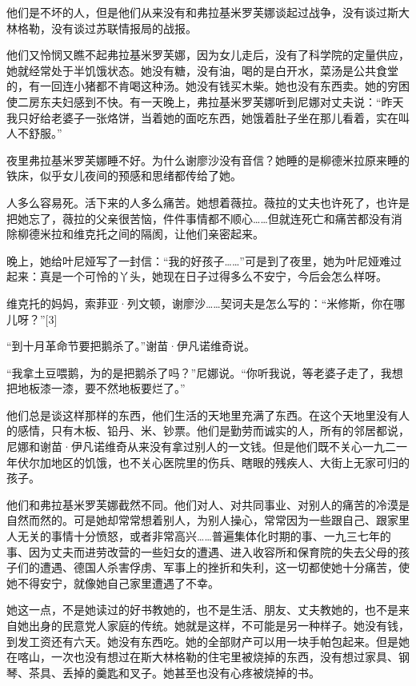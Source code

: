他们是不坏的人，但是他们从来没有和弗拉基米罗芙娜谈起过战争，没有谈过斯大林格勒，没有谈过苏联情报局的战报。

他们又怜悯又瞧不起弗拉基米罗芙娜，因为女儿走后，没有了科学院的定量供应，她就经常处于半饥饿状态。她没有糖，没有油，喝的是白开水，菜汤是公共食堂的，有一回连小猪都不肯喝这种汤。她没有钱买木柴。她也没有东西卖。她的穷困使二房东夫妇感到不快。有一天晚上，弗拉基米罗芙娜听到尼娜对丈夫说：“昨天我只好给老婆子一张烙饼，当着她的面吃东西，她饿着肚子坐在那儿看着，实在叫人不舒服。”

夜里弗拉基米罗芙娜睡不好。为什么谢廖沙没有音信？她睡的是柳德米拉原来睡的铁床，似乎女儿夜间的预感和思绪都传给了她。

人多么容易死。活下来的人多么痛苦。她想着薇拉。薇拉的丈夫也许死了，也许是把她忘了，薇拉的父亲很苦恼，件件事情都不顺心……但就连死亡和痛苦都没有消除柳德米拉和维克托之间的隔阂，让他们亲密起来。

晚上，她给叶尼娅写了一封信：“我的好孩子……”可是到了夜里，她为叶尼娅难过起来：真是一个可怜的丫头，她现在日子过得多么不安宁，今后会怎么样呀。

维克托的妈妈，索菲亚·列文顿，谢廖沙……契诃夫是怎么写的：“米修斯，你在哪儿呀？”[3]

“到十月革命节要把鹅杀了。”谢苗·伊凡诺维奇说。

“我拿土豆喂鹅，为的是把鹅杀了吗？”尼娜说。“你听我说，等老婆子走了，我想把地板漆一漆，要不然地板要烂了。”

他们总是谈这样那样的东西，他们生活的天地里充满了东西。在这个天地里没有人的感情，只有木板、铅丹、米、钞票。他们是勤劳而诚实的人，所有的邻居都说，尼娜和谢苗·伊凡诺维奇从来没有拿过别人的一文钱。但是他们既不关心一九二一年伏尔加地区的饥饿，也不关心医院里的伤兵、瞎眼的残疾人、大街上无家可归的孩子。

他们和弗拉基米罗芙娜截然不同。他们对人、对共同事业、对别人的痛苦的冷漠是自然而然的。可是她却常常想着别人，为别人操心，常常因为一些跟自己、跟家里人无关的事情十分愤怒，或者非常高兴……普遍集体化时期的事、一九三七年的事、因为丈夫而进劳改营的一些妇女的遭遇、进入收容所和保育院的失去父母的孩子们的遭遇、德国人杀害俘虏、军事上的挫折和失利，这一切都使她十分痛苦，使她不得安宁，就像她自己家里遭遇了不幸。

她这一点，不是她读过的好书教她的，也不是生活、朋友、丈夫教她的，也不是来自她出身的民意党人家庭的传统。她就是这样，不可能是另一种样子。她没有钱，到发工资还有六天。她没有东西吃。她的全部财产可以用一块手帕包起来。但是她在喀山，一次也没有想过在斯大林格勒的住宅里被烧掉的东西，没有想过家具、钢琴、茶具、丢掉的羹匙和叉子。她甚至也没有心疼被烧掉的书。

